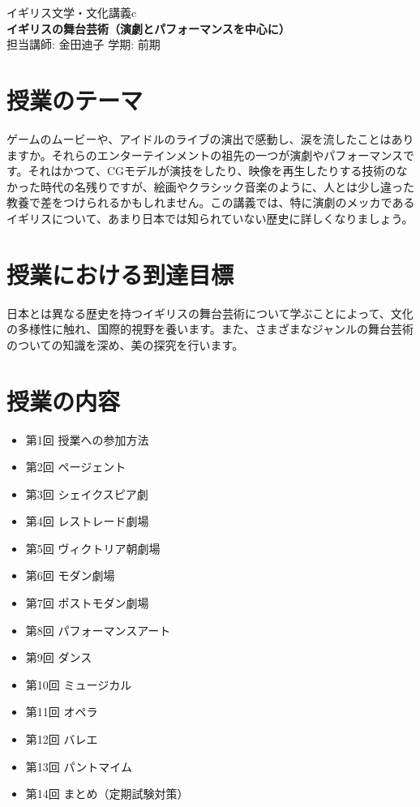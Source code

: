 \documentclass{jlreq}
\begin{document}

\begin{center}
    \huge{イギリス文学・文化講義c} \\
    \large{\textbf{イギリスの舞台芸術（演劇とパフォーマンスを中心に）}} \\
    \vspace{0.3cm}
    \large{担当講師: 金田迪子 \quad 学期: 前期}
\end{center}
\vspace{0.5cm}

\begin{multicols}{2}
\section*{授業のテーマ}
ゲームのムービーや、アイドルのライブの演出で感動し、涙を流したことはありますか。それらのエンターテインメントの祖先の一つが演劇やパフォーマンスです。それはかつて、CGモデルが演技をしたり、映像を再生したりする技術のなかった時代の名残りですが、絵画やクラシック音楽のように、人とは少し違った教養で差をつけられるかもしれません。この講義では、特に演劇のメッカであるイギリスについて、あまり日本では知られていない歴史に詳しくなりましょう。
\section*{授業における到達目標}
日本とは異なる歴史を持つイギリスの舞台芸術について学ぶことによって、文化の多様性に触れ、国際的視野を養います。また、さまざまなジャンルの舞台芸術のついての知識を深め、美の探究を行います。

\section*{授業の内容}
\begin{itemize}
\item 第1回 授業への参加方法
\item 第2回 ページェント
\item 第3回 シェイクスピア劇
\item 第4回 レストレード劇場
\item 第5回 ヴィクトリア朝劇場
\item 第6回 モダン劇場
\item 第7回 ポストモダン劇場
\item 第8回 パフォーマンスアート
\item 第9回 ダンス
\item 第10回 ミュージカル
\item 第11回 オペラ
\item 第12回 バレエ
\item 第13回 パントマイム
\item 第14回 まとめ（定期試験対策）
\end{itemize}


\end{multicols}
\end{document}
